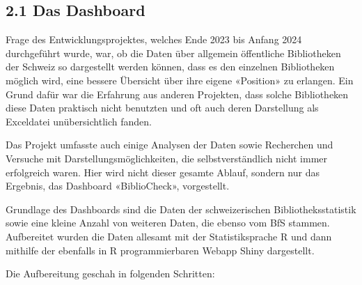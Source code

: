 \documentclass[a4paper,
fontsize=11pt,
oneside,
numbers=noperiodatend,
parskip=half-,
bibliography=totoc,
final
]{scrartcl}
\begin{document}
\subsection{2.1 Das Dashboard}\label{das-dashboard}

Frage des Entwicklungsprojektes, welches Ende 2023 bis Anfang 2024
durchgeführt wurde, war, ob die Daten über allgemein öffentliche
Bibliotheken der Schweiz so dargestellt werden können, dass es den
einzelnen Bibliotheken möglich wird, eine bessere Übersicht über ihre
eigene «Position» zu erlangen. Ein Grund dafür war die Erfahrung aus
anderen Projekten, dass solche Bibliotheken diese Daten praktisch nicht
benutzten und oft auch deren Darstellung als Exceldatei unübersichtlich
fanden.

Das Projekt umfasste auch einige Analysen der Daten sowie Recherchen und
Versuche mit Darstellungsmöglichkeiten, die selbstverständlich nicht
immer erfolgreich waren. Hier wird nicht dieser gesamte Ablauf, sondern
nur das Ergebnis, das Dashboard «BiblioCheck», vorgestellt.

Grundlage des Dashboards sind die Daten der schweizerischen
Bibliotheksstatistik sowie eine kleine Anzahl von weiteren Daten, die
ebenso vom BfS stammen. Aufbereitet wurden die Daten allesamt mit der
Statistiksprache R und dann mithilfe der ebenfalls in R programmierbaren
Webapp Shiny dargestellt.

Die Aufbereitung geschah in folgenden Schritten:
\end{document}
